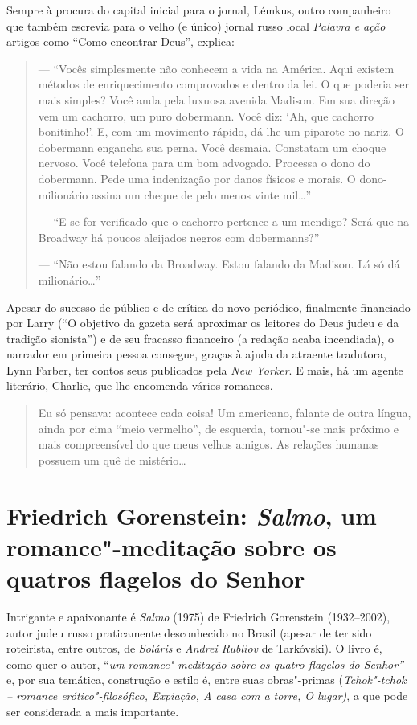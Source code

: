 Sempre à procura do capital inicial para o jornal, Lémkus, outro companheiro que também escrevia para o velho (e único) jornal russo local \emph{Palavra e ação} artigos como ``Como encontrar Deus'', explica:

\begin{quote}
--- ``Vocês simplesmente não conhecem a vida na América. Aqui existem métodos de enriquecimento comprovados e dentro da lei. O que poderia ser mais simples? Você anda pela luxuosa avenida Madison. Em sua direção vem um cachorro, um puro dobermann. Você diz: `Ah, que cachorro bonitinho!'. E, com um movimento rápido, dá-lhe um piparote no nariz. O dobermann engancha sua perna. Você desmaia. Constatam um choque nervoso. Você telefona para um bom advogado. Processa o dono do dobermann. Pede uma indenização por danos físicos e morais. O dono-milionário assina um cheque de pelo menos vinte mil\ldots{}''

--- ``E se for verificado que o cachorro pertence a um mendigo? Será que na Broadway há poucos aleijados negros com dobermanns?''

--- ``Não estou falando da Broadway. Estou falando da Madison. Lá só dá milionário\ldots{}''
\end{quote}

Apesar do sucesso de público e de crítica do novo periódico, finalmente financiado por Larry (``O objetivo da gazeta será aproximar os leitores do Deus judeu e da tradição sionista'') e de seu fracasso financeiro (a redação acaba incendiada), o narrador em primeira pessoa consegue, graças à ajuda da atraente tradutora, Lynn Farber, ter contos seus  publicados pela \emph{New Yorker}. E mais, há um agente literário, Charlie, que lhe encomenda vários romances.

\begin{quote}
Eu só pensava: acontece cada coisa! Um americano, falante de outra língua, ainda por cima ``meio vermelho'', de esquerda, tornou"-se mais próximo e mais compreensível do que meus velhos amigos. As relações humanas possuem um quê de mistério\ldots{}
\end{quote}

\chapter{Friedrich Gorenstein: \emph{Salmo}, um romance"-meditação sobre os quatros flagelos do Senhor}

Intrigante e apaixonante é \emph{Salmo} (1975) de Friedrich Gorenstein (1932--2002), autor judeu russo praticamente desconhecido no
Brasil (apesar de ter sido roteirista, entre outros, de \emph{Soláris}
e \emph{Andrei Rubliov} de Tarkóvski). O livro é, como quer o autor,
``\emph{um romance"-meditação sobre os quatro flagelos do Senhor''} e,
por sua temática, construção e estilo é, entre suas obras"-primas
(\emph{Tchok"-tchok -- romance erótico"-filosófico, Expiação, A casa com a
torre, O lugar)}, a que pode ser considerada a mais importante.

